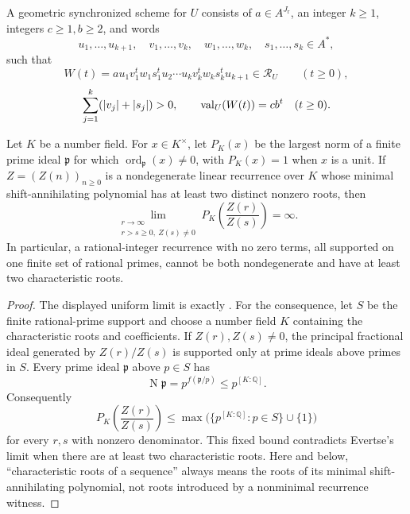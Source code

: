 \begin{definition}
  \label{def:geometric-synchronized-scheme}
  A geometric synchronized scheme for \(U\) consists of
  \(a\in A^{J_{\mathrm r}}\), an integer \(k\ge1\), integers
  \(c\ge1,b\ge2\), and words
  \[
    u_1,\ldots,u_{k+1},\quad
    v_1,\ldots,v_k,\quad w_1,\ldots,w_k,\quad
    s_1,\ldots,s_k\in A^\ast,
  \]
  such that
  \[
    W(t)=a u_1v_1^tw_1s_1^tu_2\cdots
      u_kv_k^tw_ks_k^tu_{k+1}\in\mathcal R_U
      \qquad(t\ge0),
  \]
  \[
    \sum_{j=1}^k(\lvert v_j \rvert+\lvert s_j \rvert)>0,
    \qquad \operatorname{val}_U(W(t))=cb^t\quad(t\ge0).
  \]
\end{definition}

\begin{lemma}
  \label{lem:evertse-quotient-support-input}
  Let \(K\) be a number field. For \(x\in K^\times\), let \(P_K(x)\)
  be the largest norm of a finite prime ideal \(\mathfrak p\) for which
  \(\operatorname{ord}_{\mathfrak p}(x)\ne0\), with \(P_K(x)=1\) when
  \(x\) is a unit. If \(Z=(Z(n))_{n\ge0}\) is a nondegenerate linear
  recurrence over \(K\) whose minimal shift-annihilating polynomial has
  at least two distinct nonzero roots, then
  \[
    \lim_{\substack{r\to\infty\\ r>s\ge0,\ Z(s)\ne0}}
      P_K\!\left(\frac{Z(r)}{Z(s)}\right)=\infty.
  \]
  In particular, a rational-integer recurrence with no zero terms, all
  supported on one finite set of rational primes, cannot be both
  nondegenerate and have at least two characteristic roots.
\end{lemma}

\begin{proof}
  The displayed uniform limit is exactly
  \cite[Theorem~3]{Evertse1984}. For the consequence, let \(S\) be the
  finite rational-prime support and choose a number field \(K\) containing
  the characteristic roots and coefficients. If \(Z(r),Z(s)\ne0\), the
  principal fractional ideal generated by \(Z(r)/Z(s)\) is supported
  only at prime ideals above primes in \(S\). Every prime ideal
  \(\mathfrak p\) above \(p\in S\) has
  \[
    \operatorname N\mathfrak p=p^{f(\mathfrak p/p)}
      \le p^{[K:\mathbb Q]}.
  \]
  Consequently
  \[
    P_K\!\left(\frac{Z(r)}{Z(s)}\right)
      \le \max\bigl(\{p^{[K:\mathbb Q]}:p\in S\}\cup\{1\}\bigr)
  \]
  for every \(r,s\) with nonzero denominator. This fixed bound
  contradicts Evertse's limit when there are at least two characteristic
  roots. Here and below, ``characteristic roots of a sequence'' always
  means the roots of its minimal shift-annihilating polynomial, not roots
  introduced by a nonminimal recurrence witness.
\end{proof}

